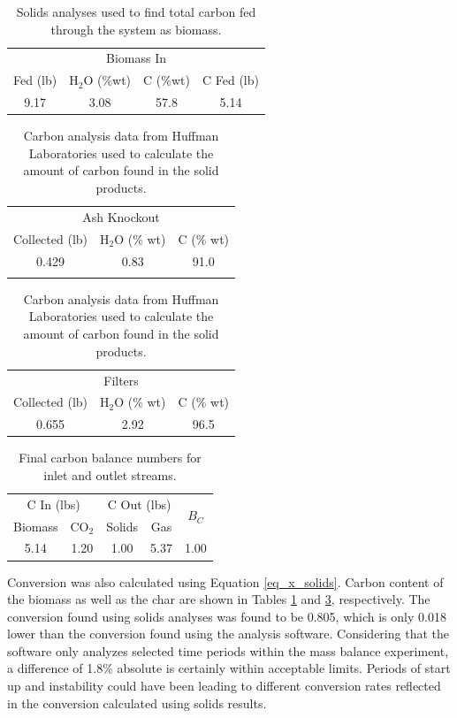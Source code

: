 \documentclass[11pt,twocolumn]{article}
\begin{document}
\begin{table}
\centering
\caption{Solids analyses used to find total carbon fed through the system as biomass.}
\label{biomass}
\begin{tabular}{c c c c}
	\toprule
	\multicolumn{4}{c}{Biomass In}	\\
	Fed (lb)	&	H$_2$O (\%wt)	&	C (\%wt)	&	C Fed (lb)	\\
	\midrule
	9.17		&	3.08			&	57.8		&	5.14		\\	
	\bottomrule
\end{tabular}
\end{table}

\begin{table}
\centering
\caption{Carbon analysis data from Huffman Laboratories used to calculate the amount of carbon found in the solid products.}
\label{char}
\begin{tabular}{c c c}
	\toprule
	\multicolumn{3}{c}{Ash Knockout}	\\
	Collected (lb)	&	H$_2$O (\% wt)		&	C (\% wt)	\\
	\midrule
	0.429	&	0.83	&	91.0 	\\
	\bottomrule
	{}	&	{}	&	{}	\\
\end{tabular}
\begin{tabular}{c c c}
	\toprule
	\multicolumn{3}{c}{Filters}	\\
	Collected (lb)	&	H$_2$O (\% wt)		&	C (\% wt)	\\
	\midrule
	0.655	&	2.92	&	96.5	\\
	\bottomrule
\end{tabular}
\end{table}

\begin{table}
	\centering
	\caption{Final carbon balance numbers for inlet and outlet streams.}
	\label{tbl_balance}
	\begin{tabular}{c c c c c}
	\toprule
	\multicolumn{2}{c}{C In (lbs)}	&	\multicolumn{2}{c}{C Out (lbs)}	&	\multirow{2}{*}{$B_C$}	\\
	Biomass	&	CO$_2$	&	Solids	&	Gas						&	{}			\\
	\midrule
	5.14		&	1.20		&	1.00	&	5.37						&	1.00		\\
	\bottomrule
	\end{tabular}
\end{table}

Conversion was also calculated using Equation \ref{eq_x_solids}.  Carbon content of the biomass as well as the char are shown in Tables \ref{biomass} and \ref{char}, respectively.  The conversion found using solids analyses was found to be 0.805, which is only 0.018 lower than the conversion found using the analysis software.  Considering that the software only analyzes selected time periods within the mass balance experiment, a difference of 1.8\% absolute is certainly within acceptable limits.  Periods of start up and instability could have been leading to different conversion rates reflected in the conversion calculated using solids results.
\end{document}
